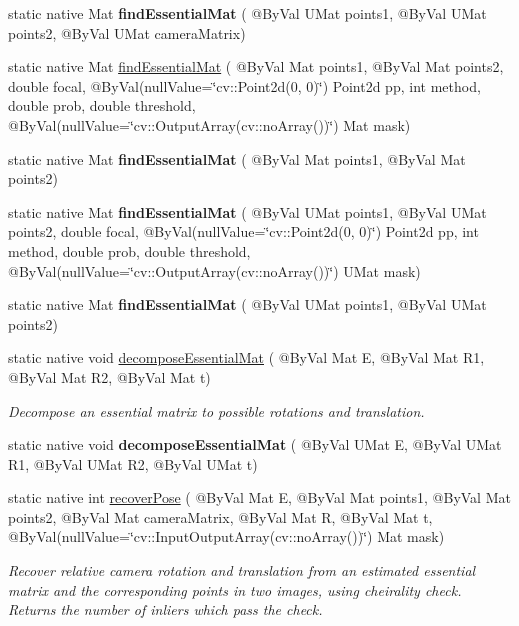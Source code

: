 \begin{DoxyCompactItemize}
\item 
static native Mat {\bfseries find\+Essential\+Mat} ( @By\+Val U\+Mat points1, @By\+Val U\+Mat points2, @By\+Val U\+Mat camera\+Matrix)
\item 
static native Mat \hyperlink{group__calib3d_gad36d1e3d84d08813292f71bad120f252}{find\+Essential\+Mat} ( @By\+Val Mat points1, @By\+Val Mat points2, double focal, @By\+Val(null\+Value=\char`\"{}cv\+::\+Point2d(0, 0)\char`\"{}) Point2d pp, int method, double prob, double threshold, @By\+Val(null\+Value=\char`\"{}cv\+::\+Output\+Array(cv\+::no\+Array())\char`\"{}) Mat mask)
\item 
static native Mat {\bfseries find\+Essential\+Mat} ( @By\+Val Mat points1, @By\+Val Mat points2)
\item 
static native Mat {\bfseries find\+Essential\+Mat} ( @By\+Val U\+Mat points1, @By\+Val U\+Mat points2, double focal, @By\+Val(null\+Value=\char`\"{}cv\+::\+Point2d(0, 0)\char`\"{}) Point2d pp, int method, double prob, double threshold, @By\+Val(null\+Value=\char`\"{}cv\+::\+Output\+Array(cv\+::no\+Array())\char`\"{}) U\+Mat mask)
\item 
static native Mat {\bfseries find\+Essential\+Mat} ( @By\+Val U\+Mat points1, @By\+Val U\+Mat points2)
\item 
static native void \hyperlink{group__calib3d_ga314b8ffe22b285bacf23b671e27d4495}{decompose\+Essential\+Mat} ( @By\+Val Mat E, @By\+Val Mat R1, @By\+Val Mat R2, @By\+Val Mat t)
\begin{DoxyCompactList}\small\item\em Decompose an essential matrix to possible rotations and translation. \end{DoxyCompactList}\item 
static native void {\bfseries decompose\+Essential\+Mat} ( @By\+Val U\+Mat E, @By\+Val U\+Mat R1, @By\+Val U\+Mat R2, @By\+Val U\+Mat t)
\item 
static native int \hyperlink{group__calib3d_gad7bafb76a3a077aa3ce1e3b98d475311}{recover\+Pose} ( @By\+Val Mat E, @By\+Val Mat points1, @By\+Val Mat points2, @By\+Val Mat camera\+Matrix, @By\+Val Mat R, @By\+Val Mat t, @By\+Val(null\+Value=\char`\"{}cv\+::\+Input\+Output\+Array(cv\+::no\+Array())\char`\"{}) Mat mask)
\begin{DoxyCompactList}\small\item\em Recover relative camera rotation and translation from an estimated essential matrix and the corresponding points in two images, using cheirality check. Returns the number of inliers which pass the check. \end{DoxyCompactList}\item 

\end{DoxyCompactItemize}
